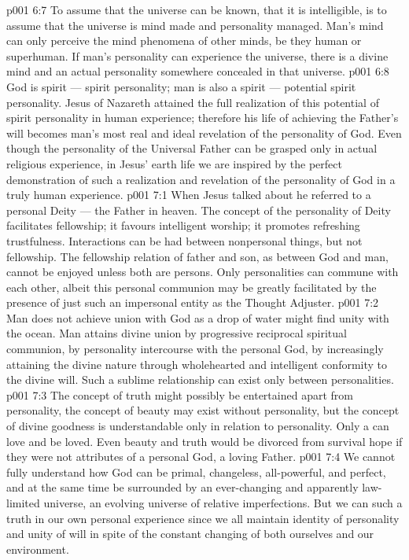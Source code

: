 \vs p001 6:7 \pc To assume that the universe can be known, that it is intelligible, is to assume that the universe is mind made and personality managed. Man’s mind can only perceive the mind phenomena of other minds, be they human or superhuman. If man’s personality can experience the universe, there is a divine mind and an actual personality somewhere concealed in that universe.
\vs p001 6:8 \pc God is spirit --- spirit personality; man is also a spirit --- potential spirit personality. Jesus of Nazareth attained the full realization of this potential of spirit personality in human experience; therefore his life of achieving the Father’s will becomes man’s most real and ideal revelation of the personality of God. Even though the personality of the Universal Father can be grasped only in actual religious experience, in Jesus’ earth life we are inspired by the perfect demonstration of such a realization and revelation of the personality of God in a truly human experience.
\vs p001 7:1 When Jesus talked about  he referred to a personal Deity --- the Father in heaven. The concept of the personality of Deity facilitates fellowship; it favours intelligent worship; it promotes refreshing trustfulness. Interactions can be had between nonpersonal things, but not fellowship. The fellowship relation of father and son, as between God and man, cannot be enjoyed unless both are persons. Only personalities can commune with each other, albeit this personal communion may be greatly facilitated by the presence of just such an impersonal entity as the Thought Adjuster.
\vs p001 7:2 Man does not achieve union with God as a drop of water might find unity with the ocean. Man attains divine union by progressive reciprocal spiritual communion, by personality intercourse with the personal God, by increasingly attaining the divine nature through wholehearted and intelligent conformity to the divine will. Such a sublime relationship can exist only between personalities.
\vs p001 7:3 \pc The concept of truth might possibly be entertained apart from personality, the concept of beauty may exist without personality, but the concept of divine goodness is understandable only in relation to personality. Only a  can love and be loved. Even beauty and truth would be divorced from survival hope if they were not attributes of a personal God, a loving Father.
\vs p001 7:4 \pc We cannot fully understand how God can be primal, changeless, all\hyp{}powerful, and perfect, and at the same time be surrounded by an ever\hyp{}changing and apparently law\hyp{}limited universe, an evolving universe of relative imperfections. But we can  such a truth in our own personal experience since we all maintain identity of personality and unity of will in spite of the constant changing of both ourselves and our environment.
